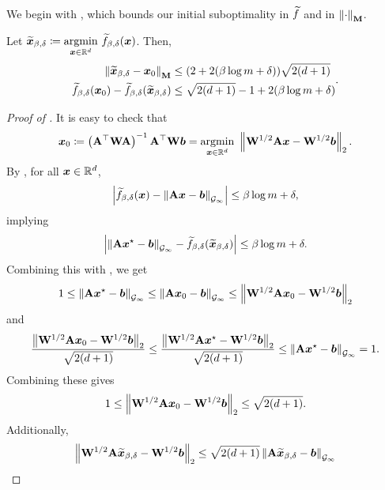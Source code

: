 We begin with , which bounds our initial suboptimality in $\widetilde{f}$ and in $\left\lVert \cdot \right\rVert_{\mathbf{M}}$.
\begin{lemma}
\label{lemma:initialization}
Let $\widetilde{\bm{x}}_{\beta,\delta} \coloneqq \underset{\bm{x}\in\mathbb{R}^d}{\mathrm{argmin}}\  \widetilde{f}_{\beta,\delta}(\bm{x})$. Then,
\begin{equation*}
    \begin{aligned}
        \left\lVert \widetilde{\bm{x}}_{\beta,\delta} - \bm{x}_0 \right\rVert_{\mathbf{M}} &\le (2+2(\beta\log m + \delta))\sqrt{2(d+1)} \\
        \widetilde{f}_{\beta,\delta}(\bm{x}_0) - \widetilde{f}_{\beta,\delta}(\widetilde{\bm{x}}_{\beta,\delta}) &\le \sqrt{2(d+1)} - 1+2(\beta\log m + \delta)
    \end{aligned}.
\end{equation*}
\end{lemma}
\begin{proof}[Proof of ]
It is easy to check that
\begin{align*}
    \bm{x}_0 \coloneqq \left(\mathbf{A}^{\top}\mathbf{W}\mathbf{A}\right)^{-1}\mathbf{A}^{\top}\mathbf{W}\bm{b} = \underset{\bm{x} \in \mathbb{R}^d}{\mathrm{argmin}}\  \left\lVert \mathbf{W}^{1/2}\mathbf{A}\bm{x}-\mathbf{W}^{1/2}\bm{b} \right\rVert_2.
\end{align*}
By , for all $\bm{x}\in\mathbb{R}^d$,
\begin{align*}
    \left\lvert \widetilde{f}_{\beta,\delta}(\bm{x})-\left\lVert \mathbf{A}\bm{x}-\bm{b} \right\rVert_{\mathcal{G}_{\infty}} \right\rvert \le \beta\log m+\delta,
\end{align*}
implying
\begin{align*}
    \left\lvert \left\lVert \mathbf{A}\bm{x}^{\star}-\bm{b} \right\rVert_{\mathcal{G}_{\infty}} - \widetilde{f}_{\beta,\delta}(\widetilde{\bm{x}}_{\beta,\delta}) \right\rvert \le \beta\log m+\delta.
\end{align*}
Combining this with , we get
\begin{align*}
    1 \le \left\lVert \mathbf{A}\bm{x}^{\star}-\bm{b} \right\rVert_{\mathcal{G}_{\infty}} \le \left\lVert \mathbf{A}\bm{x}_0-\bm{b} \right\rVert_{\mathcal{G}_{\infty}} \le \left\lVert \mathbf{W}^{1/2}\mathbf{A}\bm{x}_0 - \mathbf{W}^{1/2}\bm{b} \right\rVert_2
\end{align*}
and
\begin{align*}
    \frac{\left\lVert \mathbf{W}^{1/2}\mathbf{A}\bm{x}_0 - \mathbf{W}^{1/2}\bm{b} \right\rVert_2}{\sqrt{2(d+1)}} \le \frac{\left\lVert \mathbf{W}^{1/2}\mathbf{A}\bm{x}^{\star}-\mathbf{W}^{1/2}\bm{b} \right\rVert_2}{\sqrt{2(d+1)}} \le \left\lVert \mathbf{A}\bm{x}^{\star}-\bm{b} \right\rVert_{\mathcal{G}_{\infty}} = 1.
\end{align*}
Combining these gives
\begin{align*}
    1 \le \left\lVert \mathbf{W}^{1/2}\mathbf{A}\bm{x}_0 - \mathbf{W}^{1/2}\bm{b} \right\rVert_2 \le \sqrt{2(d+1)}.
\end{align*}
Additionally,
\begin{align*}
     \norm{\mW^{1/2}\mA\xtilde_{\beta,\delta}-\mW^{1/2}\vb}_2 &\le \sqrt{2(d+1)}\gnorm{\mA\xtilde_{\beta,\delta}-\vb}{\infty} \\

\end{align*}
\end{proof}
